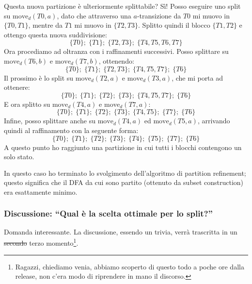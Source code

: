 \documentclass[class=book, crop=false, oneside, 12pt]{standalone}
\begin{document}
Questa nuova partizione è ulteriormente splittabile? Sì! Posso eseguire uno split su \(\textrm{move}_d(T0, a)\), dato che attraverso una \(a\)-transizione da \(T0\) mi muovo in \(\{T0,T1\}\), mentre da \(T1\) mi muovo in \(\{T2,T3\}\). Splitto quindi il blocco \(\{T1,T2\}\) e ottengo questa nuova suddivisione:
\begin{equation*}
    \{T0\};\; \{T1\};\; \{T2, T3\};\; \{T4,T5,T6,T7\}
\end{equation*}
Ora procediamo ad oltranza con i raffinamenti successivi. Posso splittare su \(\textrm{move}_d(T6,b)\) e \(\textrm{move}_d(T7,b)\), ottenendo:
\begin{equation*}
    \{T0\};\; \{T1\};\; \{T2, T3\};\; \{T4,T5,T7\};\; \{T6\}
\end{equation*}
Il prossimo è lo split su \(\textrm{move}_d(T2, a)\) e \(\textrm{move}_d(T3, a)\), che mi porta ad ottenere:
\begin{equation*}
    \{T0\};\; \{T1\};\; \{T2\};\; \{T3\};\; \{T4,T5,T7\};\; \{T6\}
\end{equation*}
E ora splitto su \(\textrm{move}_d(T4, a)\) e \(\textrm{move}_d(T7, a)\):
\begin{equation*}
    \{T0\};\; \{T1\};\; \{T2\};\; \{T3\};\; \{T4,T5\};\; \{T7\};\; \{T6\}
\end{equation*}
Infine, posso splittare anche su \(\textrm{move}_d(T4, a)\) ed \(\textrm{move}_d(T5, a)\), arrivando quindi al raffinamento con la seguente forma:
\begin{equation*}
    \{T0\};\; \{T1\};\; \{T2\};\; \{T3\};\; \{T4\};\; \{T5\};\; \{T7\};\; \{T6\}
\end{equation*}
A questo punto ho raggiunto una partizione in cui tutti i blocchi contengono un solo stato.

In questo caso ho terminato lo svolgimento dell'algoritmo di partition refinement; questo significa che il DFA da cui sono partito (ottenuto da subset construction) era esattamente minimo.

\subsubsection[Tutta da risistemare]{Discussione: “Qual è la scelta ottimale per lo split?”}
Domanda interessante. La discussione, essendo un trivia, verrà trascritta in un \sout{secondo} terzo momento\footnote{Ragazzi, chiediamo venia, abbiamo scoperto di questo todo a poche ore dalla release, non c'era modo di riprendere in mano il discorso.}.
\end{document}
